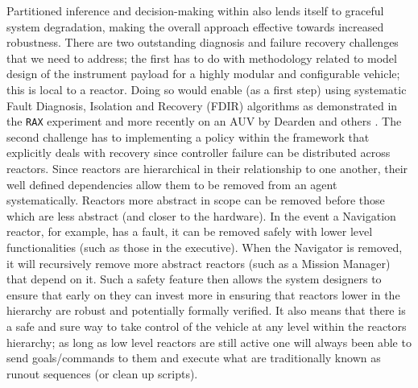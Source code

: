 Partitioned inference and decision-making within \rx also lends itself
to graceful system degradation, making the overall approach effective
towards increased robustness. There are two outstanding diagnosis and
failure recovery challenges that we need to address; the first has to
do with methodology related to model design of the instrument payload
for a highly modular and configurable vehicle; this is local to a
reactor. Doing so would enable (as a first step) using systematic
Fault Diagnosis, Isolation and Recovery (FDIR) algorithms as
demonstrated in the \texttt{RAX} experiment
\cite{williams96,mus98,williams97} and more recently on an AUV by
Dearden and others \cite{wang09,ernits10,dearden11}. The second
challenge has to implementing a policy within the \rx framework that
explicitly deals with recovery since controller failure can be
distributed across reactors. Since reactors are hierarchical in their
relationship to one another, their well defined dependencies allow
them to be removed from an agent systematically. Reactors more
abstract in scope can be removed before those which are less abstract
(and closer to the hardware). In the event a Navigation reactor, for
example, has a fault, it can be removed safely with lower level
functionalities (such as those in the executive). When the Navigator
is removed, it will recursively remove more abstract reactors (such as
a Mission Manager) that depend on it. Such a safety feature then
allows the system designers to ensure that early on they can invest
more in ensuring that reactors lower in the hierarchy are robust and
potentially formally verified. It also means that there is a safe and
sure way to take control of the vehicle at any level within the
reactors hierarchy; as long as low level reactors are still active one
will always been able to send goals/commands to them and execute what
are traditionally known as runout sequences (or clean up scripts).

